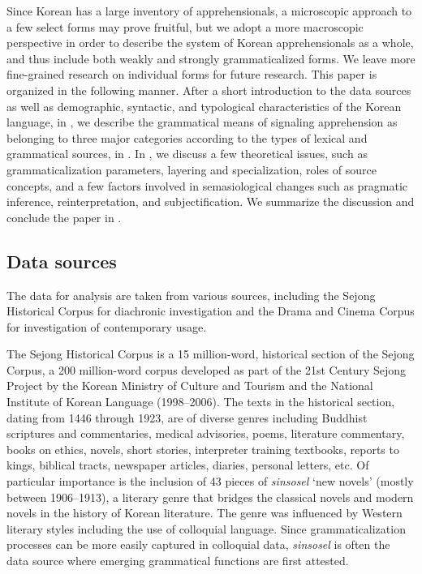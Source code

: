 \documentclass[output=paper,colorlinks,citecolor=brown]{langscibook}
\begin{document}
Since Korean has a large inventory of apprehensionals, a microscopic approach to a few select forms may prove fruitful, but we adopt a more macroscopic perspective in order to describe the system of Korean apprehensionals as a whole, and thus include both weakly and strongly grammaticalized forms. We leave more fine-grained research on individual forms for future research. This paper is organized in the following manner. After a short introduction to the data sources as well as demographic, syntactic, and typological characteristics of the Korean language, in , we describe the grammatical means of signaling apprehension as belonging to three major categories according to the types of lexical and grammatical sources, in . In , we discuss a few theoretical issues, such as grammaticalization parameters, layering and specialization, roles of source concepts, and a few factors involved in semasiological changes such as pragmatic inference, reinterpretation, and subjectification. We summarize the discussion and conclude the paper in .


\subsection{Data sources}
\label{subsec:datasources}

The data for analysis are taken from various sources, including the Sejong Historical Corpus for diachronic investigation and the Drama and Cinema Corpus for investigation of contemporary usage. 

The Sejong Historical Corpus is a 15 million-word, historical section of the Sejong Corpus, a 200 million-word corpus developed as part of the 21st Century Sejong Project by the Korean Ministry of Culture and Tourism and the National Institute of Korean Language (1998–2006). The texts in the historical section, dating from 1446 through 1923, are of diverse genres including Buddhist scriptures and commentaries, medical advisories, poems, literature commentary, books on ethics, novels, short stories, interpreter training textbooks, reports to kings, biblical tracts, newspaper articles, diaries, personal letters, etc. Of particular importance is the inclusion of 43 pieces of \textit{sinsosel} `new novels' (mostly between 1906--1913), a literary genre that bridges the classical novels and modern novels in the history of Korean literature. The genre was influenced by Western literary styles including the use of colloquial language. Since grammaticalization processes can be more easily captured in colloquial data, \textit{sinsosel} is often the data source where emerging grammatical functions are first attested.
\end{document}
